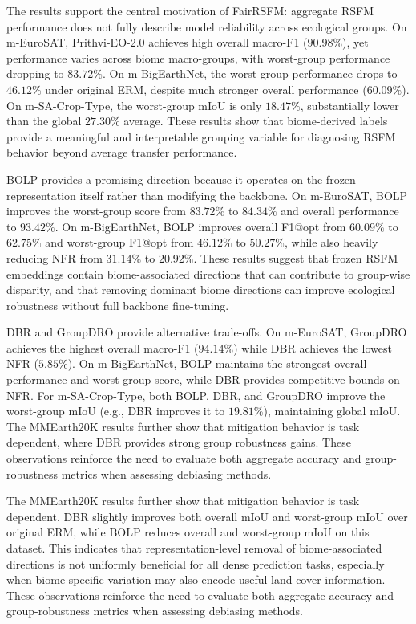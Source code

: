 \documentclass[10pt,twocolumn,letterpaper]{article}
\newcommand{\method}{FairRSFM\xspace}
\begin{document}
The results support the central motivation of \method: aggregate RSFM performance does not fully describe model reliability across ecological groups. On m-EuroSAT, Prithvi-EO-2.0 achieves high overall macro-F1 ($90.98\%$), yet performance varies across biome macro-groups, with worst-group performance dropping to $83.72\%$. On m-BigEarthNet, the worst-group performance drops to $46.12\%$ under original ERM, despite much stronger overall performance ($60.09\%$). On m-SA-Crop-Type, the worst-group mIoU is only $18.47\%$, substantially lower than the global $27.30\%$ average. These results show that biome-derived labels provide a meaningful and interpretable grouping variable for diagnosing RSFM behavior beyond average transfer performance.

BOLP provides a promising direction because it operates on the frozen representation itself rather than modifying the backbone. On m-EuroSAT, BOLP improves the worst-group score from $83.72\%$ to $84.34\%$ and overall performance to $93.42\%$. On m-BigEarthNet, BOLP improves overall F1@opt from $60.09\%$ to $62.75\%$ and worst-group F1@opt from $46.12\%$ to $50.27\%$, while also heavily reducing NFR from $31.14\%$ to $20.92\%$. These results suggest that frozen RSFM embeddings contain biome-associated directions that can contribute to group-wise disparity, and that removing dominant biome directions can improve ecological robustness without full backbone fine-tuning.

DBR and GroupDRO provide alternative trade-offs. On m-EuroSAT, GroupDRO achieves the highest overall macro-F1 ($94.14\%$) while DBR achieves the lowest NFR ($5.85\%$). On m-BigEarthNet, BOLP maintains the strongest overall performance and worst-group score, while DBR provides competitive bounds on NFR. For m-SA-Crop-Type, both BOLP, DBR, and GroupDRO improve the worst-group mIoU (e.g., DBR improves it to $19.81\%$), maintaining global mIoU. The MMEarth20K results further show that mitigation behavior is task dependent, where DBR provides strong group robustness gains. These observations reinforce the need to evaluate both aggregate accuracy and group-robustness metrics when assessing debiasing methods.

The MMEarth20K results further show that mitigation behavior is task dependent. DBR slightly improves both overall mIoU and worst-group mIoU over original ERM, while BOLP reduces overall and worst-group mIoU on this dataset. This indicates that representation-level removal of biome-associated directions is not uniformly beneficial for all dense prediction tasks, especially when biome-specific variation may also encode useful land-cover information. These observations reinforce the need to evaluate both aggregate accuracy and group-robustness metrics when assessing debiasing methods.
\end{document}
